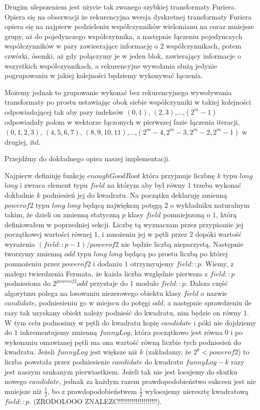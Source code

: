 \documentclass{article}
\begin{document}
Drugim ulepszeniem jest użycie tak zwanego szybkiej transformaty Furiera. Opiera się na obserwacji że rekurencyjna wersja dyskretnej transformaty Furiera opiera
się na najpierw podzieleniu współczynników wielomianu na coraz mniejsze grupy, aż do pojedynczego współczynnika, a następnie łączeniu pojedynczych współczynników
w pary zawieerające informację o $2$ współczynnikach, potem czwórki, ósemki, aż gdy połączymy je w jeden blok, zawierający informacje o wszystkich współczynnikach, a rekurencyjne wywołania służą jedynie pogrupowaniu
w jakiej kolejności będziemy wykonywać łączenia.
 
Możemy jednak to grupowanie wykonać bez rekurencyjnego wywoływania transformaty po prostu ustawiając obok siebie współczynniki w takiej kolejności odpowiadającej 
tak aby pary indeksów $(0,1)$, $(2,3)$,...,$(2^m-1)$ odpowiadały polom w wektorze łączonych w pierwszej fazie łączenia iteracji, $(0,1,2,3)$,
$(4,5,6,7)$, $(8,9,10,11)$,...,$(2^m-4,2^m-3,2^m-2,2^m-1)$ w drugiej, itd. 

Przejdźmy do dokładnego opisu naszej implementacji. 

Najpierw definiuję funkcję $enoughGoodRoot$ która przyjmuje liczbnę $k$ typu $long$ $long$ i zwraca element typu $field$ na którym aby był równy 
$1$ trzeba wykonać dokładnie $k$ podniesień jej do kwadratu. Na początku deklaruję zmienną $powerof2$ typu $long$ $long$ będącą
największą potęgą $2$ o wykładniku naturalnym takim, że dzieli on zmienną statyczną $p$ klasy $field$ pomniejszoną o $1$, którą definiowałem
w poprzedniej sekcji. Liczbę tą wyznaczam przez przypisanie jej początkowej wartości równej $1$, i mnożeniu jej w pętli przez $2$
dopóki wartość wyrażenia $(field::p-1)/powerof2$ nie będzie liczbą nieparzystą. Następnie tworzymy zmienną $odd$ typu $long$ $long$ będącą po 
prostu liczbą po której pomnożeniu przez $powerof2$ i dodaniu $1$ otrzymyujemy $field::p$. Wiemy, z małego twierdzenia Fermata, że każda liczba względnie 
pierwsza z $field::p$ podniesiona do $2^{powerof2}odd$ przystaje do $1$ modulo $field::p$. Dalsza część algorytmu polega na losowaniu niezerowego obiektu klasy $field$ o nazwie $candidate$,
podniesieniu go w miejscu do potęgi $odd$, a następnie sprawdzeniu ile razy tak uzyskany obiekt należy podnieść do kwadratu, nim będzie on równy $1$. W tym celu podnosimy w pętli do kwadratu
kopię $candidate$ i póki nie dojdziemy do $1$ inkrementujemy zmienną $funnyLog$, która początkowo jest równa $0$ i po wykonaniu omawianej pętli ma ona wartość równą liczbie tych podniesień do kwadratu. Jeżeli $funnyLog$ jest większe niż $k$ (zakładamy, że $2^k<powerof2$) to liczba powstała przez podniesienie $candidate$ do kwadratu $funnyLog-k$ razy
jest naszym szukanym pierwiastkiem. Jeżeli tak nie jest losujemy do skutku nowego $candidate$, jednak za każdym razem prawdopodobieństwo
sukcesu jest nie mniejsze niż $\frac{1}{2}$, bo z prawdopodobieństwem $\frac{1}{2}$ wylosujemy nieresztę kwadratową $field::p$. (ZRODOLOOO ZNALEZC!!!!!!!!!!!!!!!!!!!!).
\end{document}

